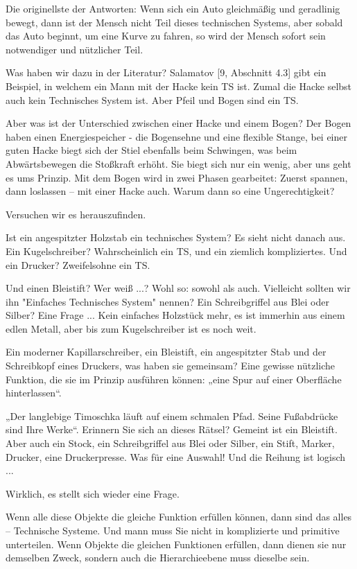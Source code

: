 \documentclass[11pt,a4paper]{article}
\begin{document}
Die originellste der Antworten: Wenn sich ein Auto gleichmäßig und geradlinig
bewegt, dann ist der Mensch nicht Teil dieses technischen Systems, aber sobald
das Auto beginnt, um eine Kurve zu fahren, so wird der Mensch sofort sein
notwendiger und nützlicher Teil.

Was haben wir dazu in der Literatur? Salamatov [9, Abschnitt 4.3] gibt ein
Beispiel, in welchem ein Mann mit der Hacke kein TS ist. Zumal die Hacke
selbst auch kein Technisches System ist. Aber Pfeil und Bogen sind ein TS.

Aber was ist der Unterschied zwischen einer Hacke und einem Bogen? Der Bogen
haben einen Energiespeicher - die Bogensehne und eine flexible Stange, bei
einer guten Hacke biegt sich der Stiel ebenfalls beim Schwingen, was beim
Abwärtsbewegen die Stoßkraft erhöht. Sie biegt sich nur ein wenig, aber uns
geht es ums Prinzip. Mit dem Bogen wird in zwei Phasen gearbeitet: Zuerst
spannen, dann loslassen -- mit einer Hacke auch. Warum dann so eine
Ungerechtigkeit?

Versuchen wir es herauszufinden. 

Ist ein angespitzter Holzstab ein technisches System? Es sieht nicht danach
aus.  Ein Kugelschreiber? Wahrscheinlich ein TS, und ein ziemlich
kompliziertes. Und ein Drucker?  Zweifelsohne ein TS.

Und einen Bleistift? Wer weiß ...? Wohl so: sowohl als auch. Vielleicht
sollten wir ihn "Einfaches Technisches System" nennen? Ein Schreibgriffel aus
Blei oder Silber? Eine Frage ...  Kein einfaches Holzstück mehr, es ist
immerhin aus einem edlen Metall, aber bis zum Kugelschreiber ist es noch weit.

Ein moderner Kapillarschreiber, ein Bleistift, ein angespitzter Stab und der
Schreibkopf eines Druckers, was haben sie gemeinsam? Eine gewisse nützliche
Funktion, die sie im Prinzip ausführen können: „eine Spur auf einer Oberfläche
hinterlassen“.

„Der langlebige Timoschka läuft auf einem schmalen Pfad. Seine Fußabdrücke
sind Ihre Werke“. Erinnern Sie sich an dieses Rätsel? Gemeint ist ein
Bleistift.  Aber auch ein Stock, ein Schreibgriffel aus Blei oder Silber, ein
Stift, Marker, Drucker, eine Druckerpresse. Was für eine Auswahl! Und die
Reihung ist logisch ...

Wirklich, es stellt sich wieder eine Frage. 

Wenn alle diese Objekte die gleiche Funktion erfüllen können, dann sind das
alles -- Technische Systeme. Und mann muss Sie nicht in komplizierte und
primitive unterteilen. Wenn Objekte die gleichen Funktionen erfüllen, dann
dienen sie nur demselben Zweck, sondern auch die Hierarchieebene muss dieselbe
sein.
\end{document}
